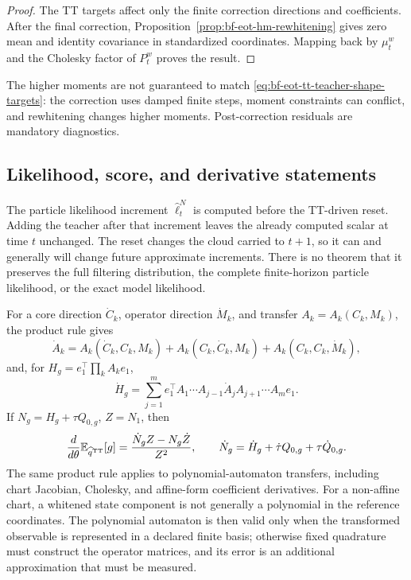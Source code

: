 \begin{proof}
The TT targets affect only the finite correction directions and coefficients.
After the final correction, Proposition~\ref{prop:bf-eot-hm-rewhitening}
gives zero mean and identity covariance in standardized coordinates.  Mapping
back by \(\mu_t^w\) and the Cholesky factor of \(P_t^w\) proves the result.
\end{proof}

The higher moments are not guaranteed to match
\eqref{eq:bf-eot-tt-teacher-shape-targets}: the correction uses damped finite
steps, moment constraints can conflict, and rewhitening changes higher
moments.  Post-correction residuals are mandatory diagnostics.

\subsection{Likelihood, score, and derivative statements}

The particle likelihood increment \(\widehat\ell_t^N\) is computed before the
TT-driven reset.  Adding the teacher after that increment leaves the already
computed scalar at time \(t\) unchanged.  The reset changes the cloud carried
to \(t+1\), so it can and generally will change future approximate increments.
There is no theorem that it preserves the full filtering distribution, the
complete finite-horizon particle likelihood, or the exact model likelihood.

For a core direction \(\dot C_k\), operator direction \(\dot M_k\), and
transfer \(A_k=A_k(C_k,M_k)\), the product rule gives
\begin{equation}
 \dot A_k
 =A_k(\dot C_k,C_k,M_k)+A_k(C_k,\dot C_k,M_k)
  +A_k(C_k,C_k,\dot M_k),
 \label{eq:bf-eot-tt-teacher-transfer-jvp}
\end{equation}
and, for \(H_g=e_1^\top\prod_kA_k e_1\),
\begin{equation}
 \dot H_g
 =\sum_{j=1}^m e_1^\top
   A_1\cdots A_{j-1}\dot A_jA_{j+1}\cdots A_m e_1.
 \label{eq:bf-eot-tt-teacher-contraction-jvp}
\end{equation}
If \(N_g=H_g+\tau Q_{0,g}\), \(Z=N_1\), then
\begin{equation}
 \frac{d}{d\theta}\mathbb E_{\widehat q^{\rm TT}}[g]
 =\frac{\dot N_gZ-N_g\dot Z}{Z^2},\qquad
 \dot N_g=\dot H_g+\dot\tau Q_{0,g}+\tau\dot Q_{0,g}.
 \label{eq:bf-eot-tt-teacher-normalized-jvp}
\end{equation}
The same product rule applies to polynomial-automaton transfers, including
chart Jacobian, Cholesky, and affine-form coefficient derivatives.  For a
non-affine chart, a whitened state component is not generally a polynomial in
the reference coordinates.  The polynomial automaton is then valid only when
the transformed observable is represented in a declared finite basis;
otherwise fixed quadrature must construct the operator matrices, and its error
is an additional approximation that must be measured.

